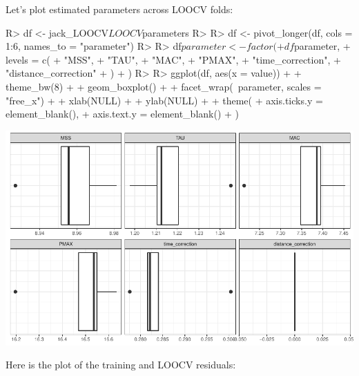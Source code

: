 \documentclass[
]{jss}
\begin{document}
Let's plot estimated parameters across LOOCV folds:

\begin{CodeChunk}
\begin{CodeInput}
R> df <- jack_LOOCV$LOOCV$parameters
R> 
R> df <- pivot_longer(df, cols = 1:6, names_to = "parameter")
R> 
R> df$parameter <- factor(
+   df$parameter,
+   levels = c(
+     "MSS",
+     "TAU",
+     "MAC",
+     "PMAX",
+     "time_correction",
+     "distance_correction"
+   )
+ )
R> 
R> ggplot(df, aes(x = value)) +
+   theme_bw(8) +
+   geom_boxplot() +
+   facet_wrap(~parameter, scales = "free_x") +
+   xlab(NULL) +
+   ylab(NULL) +
+   theme(
+     axis.ticks.y = element_blank(),
+     axis.text.y = element_blank()
+   )
\end{CodeInput}


\begin{center}\includegraphics[width=1\linewidth]{paper_files/figure-latex/unnamed-chunk-56-1} \end{center}

\end{CodeChunk}

Here is the plot of the training and LOOCV residuals:
\end{document}
